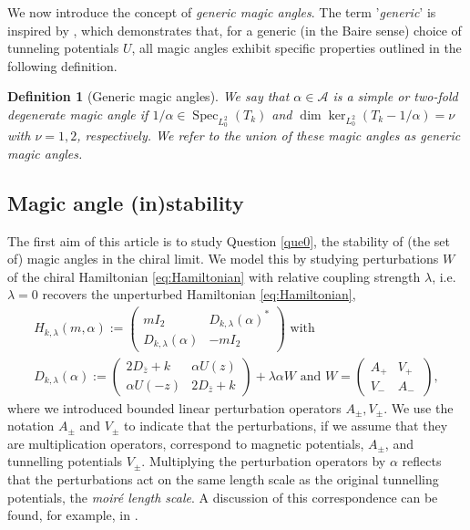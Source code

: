 \documentclass[reqno,12pt,letterpaper]{amsart}
\newtheorem{defi}[theo]{Definition}
\numberwithin{equation}{section}
\DeclareMathOperator{\Spec}{Spec}
\begin{document}
We now introduce the concept of \emph{generic magic angles}. The term '\emph{generic}' is inspired by \cite[Theo. 3]{bhz4}, which demonstrates that, for a generic (in the Baire sense) choice of tunneling potentials
$U$, all magic angles exhibit specific properties outlined in the following definition.
\begin{defi}[Generic magic angles]
\label{def:generic_mag_angle}
We say that $\alpha \in \mathcal A$ is a simple or two-fold degenerate magic angle if $1/\alpha \in \Spec_{L^2_0}(T_k)$ and $\dim \ker_{L^2_0}(T_k-1/\alpha)=\nu$ with $\nu=1,2$, respectively. We refer to the union of these magic angles as \emph{generic magic angles.}
\end{defi}
\subsection{Magic angle (in)stability}
\label{subsec:Q1}
The first aim of this article is to study Question \ref{que0}, the stability of (the set of) magic angles in the chiral limit. We model this by studying perturbations $W$ of the chiral Hamiltonian \eqref{eq:Hamiltonian} with relative coupling strength $\lambda$, i.e. $\lambda=0$ recovers the unperturbed Hamiltonian \eqref{eq:Hamiltonian}, 
\begin{equation}
\label{eq:Hk}
 \begin{aligned} H_{k,\lambda}(m,\alpha):=\begin{pmatrix} m  I_2 & D_{k,\lambda}(\alpha)^*  \\ D_{k,\lambda}(\alpha) & -m I_2 \end{pmatrix} \text{ with } \\
D_{k,\lambda}(\alpha):=\begin{pmatrix} 2D_{\bar z} +k& \alpha U(z) \\ \alpha U(-z)  & 2D_{\bar z}+k \end{pmatrix} + \lambda \alpha  W \text{ and } W=\begin{pmatrix}  A_+ &  V_+ \\ 
 V_-  &  A_- \ 
\end{pmatrix}, \end{aligned}
\end{equation}
where we introduced bounded linear perturbation operators $A_{\pm},V_{\pm}$. We use the notation $A_{\pm}$ and $V_{\pm}$ to indicate that the perturbations, if we assume that they are multiplication operators, correspond to magnetic potentials, $A_{\pm}$, and tunnelling potentials $V_{\pm}.$ Multiplying the perturbation operators by $\alpha$ reflects that the perturbations act on the same length scale as the original tunnelling potentials, the \emph{moir\'e length scale}. A discussion of this correspondence can be found, for example, in \cite{suppl,magic}.
\end{document}
